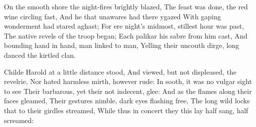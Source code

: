 \documentclass[10pt,twocolumn]{book}
\begin{document}
   On the smooth shore the night-fires brightly blazed,
   The feast was done, the red wine circling fast,
   And he that unawares had there ygazed
   With gaping wonderment had stared aghast;
   For ere night's midmost, stillest hour was past,
   The native revels of the troop began;
   Each palikar his sabre from him cast,
   And bounding hand in hand, man linked to man,
Yelling their uncouth dirge, long danced the kirtled clan.


   Childe Harold at a little distance stood,
   And viewed, but not displeased, the revelrie,
   Nor hated harmless mirth, however rude:
   In sooth, it was no vulgar sight to see
   Their barbarous, yet their not indecent, glee:
   And as the flames along their faces gleamed,
   Their gestures nimble, dark eyes flashing free,
   The long wild locks that to their girdles streamed,
While thus in concert they this lay half sang, half screamed:

\spatium {1\leading}
\end{document}
